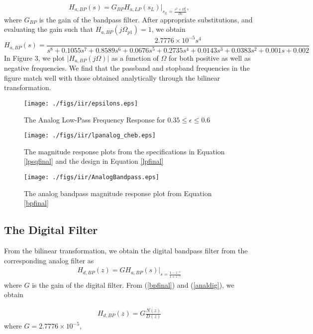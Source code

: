 \documentclass[journal,12pt,twocolumn]{IEEEtran}
\begin{document}
\begin{enumerate}
\begin{equation}
H_{a,BP}(s) = G_{BP}H_{a,LP}(s_L)\vert_{s_L = \frac{s^2 + \Omega_0^2}{Bs}},
\end{equation}
where $G_{BP}$ is the gain of the bandpass filter.  After appropriate substitutions, and evaluating the gain 
such that $H_{a,BP}(j\Omega_{p1}) = 1$, we obtain
{\tiny
\begin{equation}
\label{bpfinal}
H_{a,BP}(s) = \frac{2.7776\times 10^{-5}s^4}{s^8+0.1055s^7+0.8589s^6+0.0676s^5+0.2735s^4+0.0143s^3+0.0383s^2+0.001s+0.002}
\end{equation}
}
In Figure 3, we plot $\vert H_{a,BP}(j\Omega)\vert$ as a function of $\Omega$ for both positive as
well as negative frequencies.  We find that the passband and stopband frequencies in the figure
match well with those obtained analytically through the bilinear transformation.
\end{enumerate}
\begin{figure}
\label{fig1}
\texttt{[image: ./figs/iir/epsilons.eps]}
\caption{The Analog Low-Pass Frequency Response for $0.35 \leq \epsilon \leq 0.6$}
\end{figure}


\begin{figure}
\label{fig2}
\texttt{[image: ./figs/iir/lpanalog\_cheb.eps]}
\caption{The magnitude response plots from the specifications in Equation \ref{lpsqfinal} and the design in Equation \ref{lpfinal}}
\end{figure}

\begin{figure}
\label{fig3}
\texttt{[image: ./figs/iir/AnalogBandpass.eps]}
\caption{The analog bandpass magnitude response plot from Equation \ref{bpfinal}} 
\end{figure}

\subsection{The Digital Filter}
From the bilinear transformation, we obtain the digital bandpass filter from the corresponding analog filter as
\begin{eqnarray}
\label{analdig}
H_{d,BP}(z) = GH_{a,BP}(s)\vert_{s = \frac{1-z^{-1}}{1 + z^{-1}}}
\end{eqnarray}
where $G$ is the gain of the digital filter.  From (\ref{bpfinal}) and (\ref{analdig}), we obtain

\begin{eqnarray}
H_{d,BP}(z) = G \frac{N(z)}{D(z)}
\end{eqnarray}
where $G = 2.7776 \times 10^{-5}$,
\end{document}
